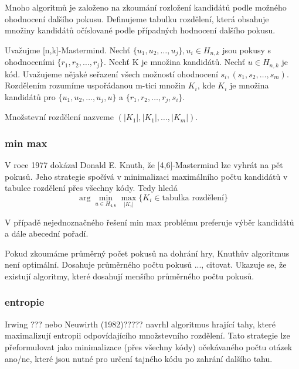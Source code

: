 Mnoho algoritmů je založeno na zkoumání rozložení kandidátů podle možného ohodnocení dalšího pokusu. Definujeme tabulku rozdělení, která obsahuje množiny kandidátů očíslované podle případných hodnocení dalšího pokusu. 
\begin{definice}[rozdělení]\label{def01:2}
  Uvažujme [n,k]-Mastermind. \hfill \break Nechť $\{u_1, u_2, \dots, u_j\}, u_i \in H_{n,k}$ jsou pokusy s ohodnoceními $\{r_1, r_2, \dots, r_j\}$. Nechť K je množina kandidátů. Nechť $u \in H_{n,k}$ je kód. Uvažujeme nějaké seřazení všech možností ohodnocení $s_i, (s_1, s_2, \dots, s_m)$. Rozdělením rozumíme uspořádanou m-tici množin $K_i$, kde $K_i$ je množina kandidátů pro $\{u_1, u_2, \dots, u_j, u\}$ a $\{r_1, r_2, \dots, r_j, s_i\}$.

  Množstevní rozdělení nazveme $(|K_1|, |K_1|, \dots, |K_m|)$.
\end{definice}

\subsubsection{min max}

V roce 1977 dokázal Donald E. Knuth, že [4,6]-Mastermind lze vyhrát na pět pokusů.\cite{donald_e__knuth_1977} Jeho strategie spočívá v minimalizaci maximálního počtu kandidátů v tabulce rozdělení přes všechny kódy. Tedy hledá 
\[ \arg\min_{u \in H_{4,6}} \max_{|K_i|} \{ K_i \in \textrm{tabulka rozdělení}\} \]

V případě nejednoznačného řešení min max problému preferuje výběr kandidátů a dále abecední pořadí. 


Pokud zkoumáme průměrný počet pokusů na dohrání hry, Knuthův algoritmus není optimální. Dosahuje průměrného počtu pokusů ..., citovat. Ukazuje se, že existují algoritmy, které dosahují menšího průměrného počtu pokusů.





\subsubsection{entropie}
Irwing ??? nebo Neuwirth (1982)????? navrhl algoritmus hrající tahy, které maximalizují entropii odpovídajícího množstevního rozdělení. Tato strategie lze přeformulovat jako minimalizace (přes všechny kódy) očekávaného počtu otázek ano/ne, které jsou nutné pro určení tajného kódu po zahrání dalšího tahu.

